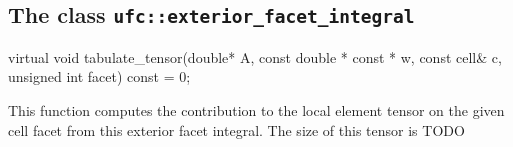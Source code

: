 







\subsection{The class \texttt{ufc::exterior\_facet\_integral}}
\begin{code}
virtual void tabulate_tensor(double* A,
                             const double * const * w,
                             const cell& c,
                             unsigned int facet) const = 0;
\end{code}
This function computes the contribution to the local element tensor
on the given cell facet from this exterior facet integral.
The size of this tensor is TODO






